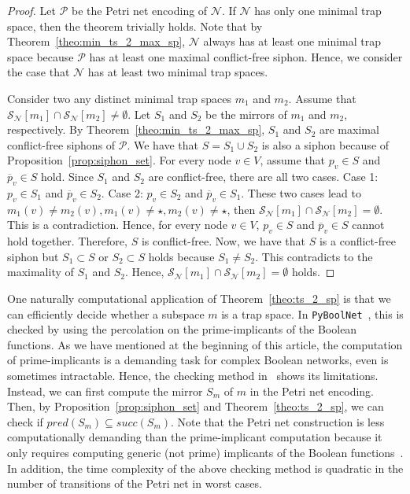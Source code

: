 \documentclass[preprint,12pt]{elsarticle}
\begin{document}
\begin{proof}

  Let \(\mathcal{P}\) be the Petri net encoding of \(\mathcal{N}\).
  If \(\mathcal{N}\) has only one minimal trap space, then the theorem trivially holds.
  Note that by Theorem~\ref{theo:min_ts_2_max_sp}, \(\mathcal{N}\) always has at least one minimal trap space because \(\mathcal{P}\) has at least one maximal conflict-free siphon.
  Hence, we consider the case that \(\mathcal{N}\) has at least two minimal trap spaces.

  Consider two any distinct minimal trap spaces \(m_1\) and \(m_2\).
  Assume that \(\mathcal{S}_{\mathcal{N}}[m_1] \cap \mathcal{S}_{\mathcal{N}}[m_2] \neq \emptyset\).
  Let \(S_1\) and \(S_2\) be the mirrors of \(m_1\) and \(m_2\), respectively.
  By Theorem~\ref{theo:min_ts_2_max_sp}, \(S_1\) and \(S_2\) are maximal conflict-free siphons of \(\mathcal{P}\).
  We have that \(S = S_1 \cup S_2\) is also a siphon because of Proposition~\ref{prop:siphon_set}.
  For every node \(v \in V\), assume that \(p_v \in S\) and \(\overline{p}_v \in S\) hold.
  Since \(S_1\) and \(S_2\) are conflict-free, there are all two cases.
  Case 1: \(p_v \in S_1\) and \(\overline{p}_v \in S_2\).
  Case 2: \(p_v \in S_2\) and \(\overline{p}_v \in S_1\).
  These two cases lead to \(m_1(v) \neq m_2(v), m_1(v) \neq \star, m_2(v) \neq \star\), then  \(\mathcal{S}_{\mathcal{N}}[m_1] \cap \mathcal{S}_{\mathcal{N}}[m_2] = \emptyset\).
  This is a contradiction.
  Hence, for every node \(v \in V\), \(p_v \in S\) and \(\overline{p}_v \in S\) cannot hold together.
  Therefore, \(S\) is conflict-free.
  Now, we have that \(S\) is a conflict-free siphon but \(S_1 \subset S\) or \(S_2 \subset S\) holds because \(S_1 \neq S_2\).
  This contradicts to the maximality of \(S_1\) and \(S_2\).
  Hence, \(\mathcal{S}_{\mathcal{N}}[m_1] \cap \mathcal{S}_{\mathcal{N}}[m_2] = \emptyset\) holds.
  
\end{proof}

One naturally computational application of Theorem~\ref{theo:ts_2_sp} is that we can efficiently decide whether a subspace \(m\) is a trap space.
In \texttt{PyBoolNet}~\cite{klarner2017pyboolnet}, this is checked by using the percolation on the prime-implicants of the Boolean functions.
As we have mentioned at the beginning of this article, the computation of prime-implicants is a demanding task for complex Boolean networks, even is sometimes intractable.
Hence, the checking method in~\cite{klarner2017pyboolnet} shows its limitations.
Instead, we can first compute the mirror \(S_m\) of \(m\) in the Petri net encoding.
Then, by Proposition~\ref{prop:siphon_set} and Theorem~\ref{theo:ts_2_sp}, we can check if \(pred(S_m) \subseteq succ(S_m)\).
Note that the Petri net construction is less computationally demanding than the prime-implicant computation because it only requires computing generic (not prime) implicants of the Boolean functions~\cite{chatain2014characterization}.
In addition, the time complexity of the above checking method is quadratic in the number of transitions of the Petri net in worst cases.
\end{document}
